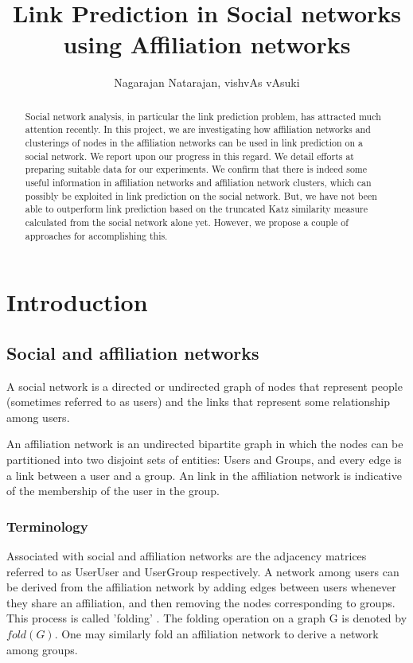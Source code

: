 \documentclass{report}
\title{Link Prediction in Social networks using Affiliation networks}
\author{Nagarajan Natarajan, vishvAs vAsuki}
\date{}
\begin{document}
\maketitle
\tableofcontents

\begin{abstract}
Social network analysis, in particular the link prediction problem, has attracted much attention recently. In this project, we are investigating how affiliation networks and clusterings of nodes in the affiliation networks can be used in link prediction on a social network. We report upon our progress in this regard. We detail efforts at preparing suitable data for our experiments. We confirm that there is indeed some useful information in affiliation networks and affiliation network clusters, which can possibly be exploited in link prediction on the social network. But, we have not been able to outperform link prediction based on the truncated Katz similarity measure calculated from the social network alone yet. However, we propose a couple of approaches for accomplishing this.
\end{abstract}


\chapter{Introduction}
\section{Social and affiliation networks}
A social network is a directed or undirected graph of nodes that represent people (sometimes referred to as users) and the links that represent some relationship among users.

An affiliation network is an undirected bipartite graph in which the nodes can be partitioned into two disjoint sets of entities: Users and Groups, and every edge is a link between a user and a group. An link in the affiliation network is indicative of the membership of the user in the group.

\subsection{Terminology}
Associated with social and affiliation networks are the adjacency matrices referred to as UserUser and UserGroup respectively. A network among users can be derived from the affiliation network by adding edges between users whenever they share an affiliation, and then removing the nodes corresponding to groups. This process is called 'folding' \cite{sivakumarAffiliation}. The folding operation on a graph G is denoted by $fold(G)$. One may similarly fold an affiliation network to derive a network among groups.
\end{document}
